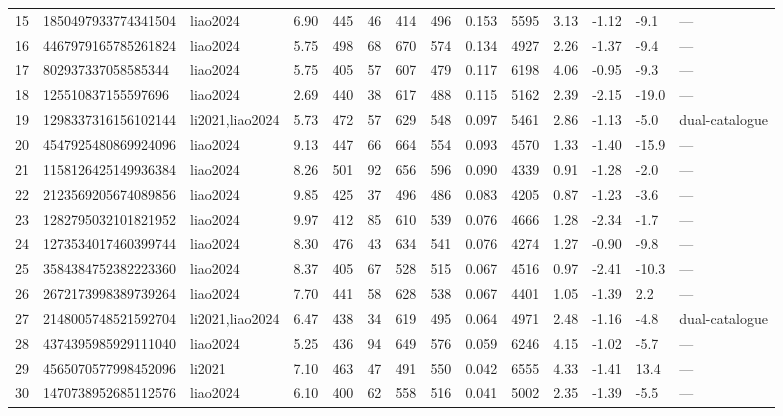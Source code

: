 \begin{tabular}{llllllllllllll}
15 & 1850497933774341504 & liao2024 & 6.90 & 445 & 46 & 414 & 496 & 0.153 & 5595 & 3.13 & -1.12 & -9.1 & --- \\
16 & 4467979165785261824 & liao2024 & 5.75 & 498 & 68 & 670 & 574 & 0.134 & 4927 & 2.26 & -1.37 & -9.4 & --- \\
17 & 802937337058585344 & liao2024 & 5.75 & 405 & 57 & 607 & 479 & 0.117 & 6198 & 4.06 & -0.95 & -9.3 & --- \\
18 & 125510837155597696 & liao2024 & 2.69 & 440 & 38 & 617 & 488 & 0.115 & 5162 & 2.39 & -2.15 & -19.0 & --- \\
19 & 1298337316156102144 & li2021,liao2024 & 5.73 & 472 & 57 & 629 & 548 & 0.097 & 5461 & 2.86 & -1.13 & -5.0 & dual-catalogue \\
20 & 4547925480869924096 & liao2024 & 9.13 & 447 & 66 & 664 & 554 & 0.093 & 4570 & 1.33 & -1.40 & -15.9 & --- \\
21 & 1158126425149936384 & liao2024 & 8.26 & 501 & 92 & 656 & 596 & 0.090 & 4339 & 0.91 & -1.28 & -2.0 & --- \\
22 & 2123569205674089856 & liao2024 & 9.85 & 425 & 37 & 496 & 486 & 0.083 & 4205 & 0.87 & -1.23 & -3.6 & --- \\
23 & 1282795032101821952 & liao2024 & 9.97 & 412 & 85 & 610 & 539 & 0.076 & 4666 & 1.28 & -2.34 & -1.7 & --- \\
24 & 1273534017460399744 & liao2024 & 8.30 & 476 & 43 & 634 & 541 & 0.076 & 4274 & 1.27 & -0.90 & -9.8 & --- \\
25 & 3584384752382223360 & liao2024 & 8.37 & 405 & 67 & 528 & 515 & 0.067 & 4516 & 0.97 & -2.41 & -10.3 & --- \\
26 & 2672173998389739264 & liao2024 & 7.70 & 441 & 58 & 628 & 538 & 0.067 & 4401 & 1.05 & -1.39 & 2.2 & --- \\
27 & 2148005748521592704 & li2021,liao2024 & 6.47 & 438 & 34 & 619 & 495 & 0.064 & 4971 & 2.48 & -1.16 & -4.8 & dual-catalogue \\
28 & 4374395985929111040 & liao2024 & 5.25 & 436 & 94 & 649 & 576 & 0.059 & 6246 & 4.15 & -1.02 & -5.7 & --- \\
29 & 4565070577998452096 & li2021 & 7.10 & 463 & 47 & 491 & 550 & 0.042 & 6555 & 4.33 & -1.41 & 13.4 & --- \\
30 & 1470738952685112576 & liao2024 & 6.10 & 400 & 62 & 558 & 516 & 0.041 & 5002 & 2.35 & -1.39 & -5.5 & --- \\
\bottomrule
\end{tabular}

